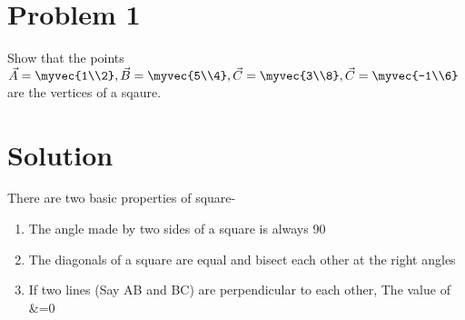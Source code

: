 \documentclass[journal,12pt,twocolumn]{IEEEtran}
\begin{document}
\section{Problem 1}
Show that the points$\vec {A}=\myvec {1\\2},
\vec {B}=\myvec {5\\4},
\vec {C}=\myvec {3\\8},
\vec {C}=\myvec {-1\\6}$ are the vertices of a sqaure.
\section{Solution}
There are two basic properties of square-
\begin{lemma}
\begin{enumerate}


     \item  The angle made by two sides of a square is always 90\degree
     \item  The diagonals of a square are equal and bisect each other at the right angles
     \item  If two lines (Say AB and BC) are perpendicular to each   other, The value of &=0
     
\end{enumerate}
\end{lemma}
\end{document}
